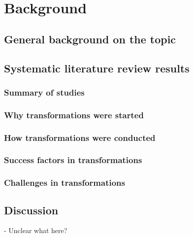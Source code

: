 
\chapter{Background}
\label{chapter:background}


\section{General background on the topic}


\section{Systematic literature review results}

\subsection{Summary of studies}

\subsection{Why transformations were started}

\subsection{How transformations were conducted}

\subsection{Success factors in transformations}

\subsection{Challenges in transformations}


\section{Discussion}

- Unclear what here?

